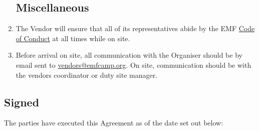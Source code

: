 \begin{enumerate}
\subsection*{Miscellaneous}
\item The Vendor will ensure that all of its representatives abide by the EMF
        \href{https://www.emfcamp.org/code-of-conduct}{Code of Conduct} at all times while on site.
\item Before arrival on site, all communication with the Organiser should be by email sent to
        \href{mailto:vendors@emfcamp.org}{vendors@emfcamp.org}. On site, communication should be
        with the vendors coordinator or duty site manager.

\end{enumerate}

\subsection*{Signed}
The parties have executed this Agreement as of the date set out below:





